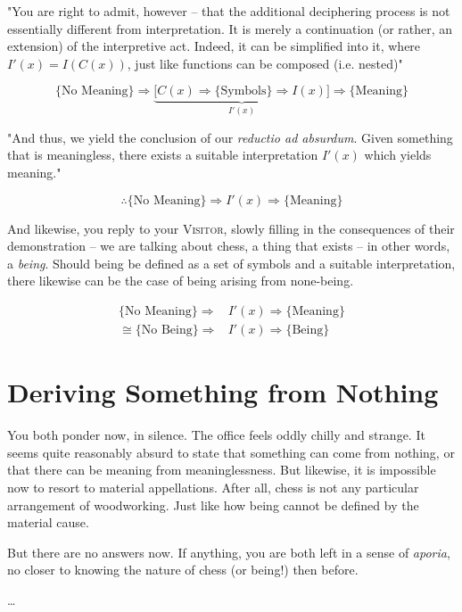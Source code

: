 "You are right to admit, however -- that the additional deciphering process is not essentially different from interpretation. It is merely a continuation (or rather, an extension) of the interpretive act. Indeed, it can be simplified into it, where $I'(x) = I(C(x))$, just like functions can be composed (i.e. nested)"

\begin{equation*}
  \{\text{No Meaning}\} \Rightarrow \underbrace{ \big[ C(x) \Rightarrow \{\text{Symbols}\} \Rightarrow I(x) \big] }_{I'(x)} \Rightarrow \{\text{Meaning}\}
\end{equation*}

\noindent
"And thus, we yield the conclusion of our \emph{reductio ad absurdum}. Given something that is meaningless, there exists a suitable interpretation $I'(x)$ which yields meaning."

\begin{equation*}
  \therefore \{\text{No Meaning}\} \Rightarrow I'(x) \Rightarrow \{\text{Meaning}\}
\end{equation*}

And likewise, you reply to your \textsc{Visitor}, slowly filling in the consequences of their demonstration -- we are talking about chess, a thing that exists -- in other words, a \emph{being}. Should being be defined as a set of symbols and a suitable interpretation, there likewise can be the case of being arising from none-being.

\begin{align*}
  \{\text{No Meaning}\} \Rightarrow &I'(x) \Rightarrow \{\text{Meaning}\} \\
  \cong \{\text{No Being}\} \Rightarrow &I'(x) \Rightarrow \{\text{Being}\}
\end{align*}

\section{Deriving Something from Nothing}

You both ponder now, in silence. The office feels oddly chilly and strange. It seems quite reasonably absurd to state that something can come from nothing, or that there can be meaning from meaninglessness. But likewise, it is impossible now to resort to material appellations. After all, chess is not any particular arrangement of woodworking. Just like how being cannot be defined by the material cause.

But there are no answers now. If anything, you are both left in a sense of \emph{aporia}, no closer to knowing the nature of chess (or being!) then before.

\ldots
